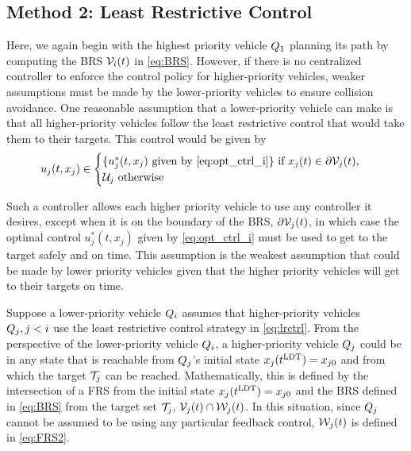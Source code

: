 \subsection{Method 2: Least Restrictive Control \label{sec:lrc}}
Here, we again begin with the highest priority vehicle $Q_1$ planning its path by computing the BRS $\mathcal{V}_i(t)$ in \eqref{eq:BRS}. However, if there is no centralized controller to enforce the control policy for higher-priority vehicles, weaker assumptions must be made by the lower-priority vehicles to ensure collision avoidance. One reasonable assumption that a lower-priority vehicle can make is that all higher-priority vehicles follow the least restrictive control that would take them to their targets. This control would be given by 
\vspace{-0.4em}
\begin{equation}
\label{eq:lrctrl} %
u_j(t, x_j)\in \begin{cases} \{u_j^*(t, x_j) \text{ given by } \eqref{eq:opt_ctrl_i}\} \text{ if } x_j(t)\in \partial \brs_j(t), \\
\cset_j  \text{ otherwise}
\end{cases}
\end{equation}

Such a controller allows each higher priority vehicle to use any controller it desires, except when it is on the boundary of the BRS, $\partial \mathcal{V}_j(t)$, in which case the optimal control $u_j^*(t, x_j)$ given by \eqref{eq:opt_ctrl_i} must be used to get to the target safely and on time. This assumption is the weakest assumption that could be made by lower priority vehicles given that the higher priority vehicles will get to their targets on time.

Suppose a lower-priority vehicle $Q_i$ assumes that higher-priority vehicles $Q_j, j < i$ use the least restrictive control strategy in \eqref{eq:lrctrl}. From the perspective of the lower-priority vehicle $Q_i$, a higher-priority vehicle $Q_j$ could be in any state that is reachable from $Q_j$'s initial state $x_j(t^\text{LDT}) = x_{j0}$ and from which the target $\mathcal{T}_j$ can be reached. Mathematically, this is defined by the intersection of a FRS from the initial state $x_j(t^\text{LDT})=x_{j0}$ and the BRS defined in \eqref{eq:BRS} from the target set $\mathcal{T}_j$, $\mathcal{V}_j(t) \cap \mathcal{W}_j(t)$. In this situation, since $Q_j$ cannot be assumed to be using any particular feedback control, $\mathcal{W}_j(t)$ is defined in \eqref{eq:FRS2}.
\vspace{-0.4em}

